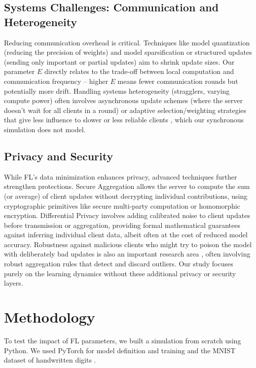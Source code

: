 \documentclass[conference]{IEEEtran}
\begin{document}
\subsection{Systems Challenges: Communication and Heterogeneity}
Reducing communication overhead is critical. Techniques like model quantization (reducing the precision of weights) \cite{b6} and model sparsification or structured updates (sending only important or partial updates) \cite{b5} aim to shrink update sizes. Our parameter $E$ directly relates to the trade-off between local computation and communication frequency – higher $E$ means fewer communication rounds but potentially more drift. Handling systems heterogeneity (stragglers, varying compute power) often involves asynchronous update schemes (where the server doesn't wait for all clients in a round) or adaptive selection/weighting strategies that give less influence to slower or less reliable clients \cite{b19}, which our synchronous simulation does not model.

\subsection{Privacy and Security}
While FL's data minimization enhances privacy, advanced techniques further strengthen protections. Secure Aggregation \cite{b13} allows the server to compute the sum (or average) of client updates without decrypting individual contributions, using cryptographic primitives like secure multi-party computation or homomorphic encryption. Differential Privacy \cite{b14, b15} involves adding calibrated noise to client updates before transmission or aggregation, providing formal mathematical guarantees against inferring individual client data, albeit often at the cost of reduced model accuracy. Robustness against malicious clients who might try to poison the model with deliberately bad updates is also an important research area \cite{b11}, often involving robust aggregation rules that detect and discard outliers. Our study focuses purely on the learning dynamics without these additional privacy or security layers.


\section{Methodology}
To test the impact of FL parameters, we built a simulation from scratch using Python. We used PyTorch for model definition and training \cite{b17} and the MNIST dataset of handwritten digits \cite{b4}.
\end{document}
